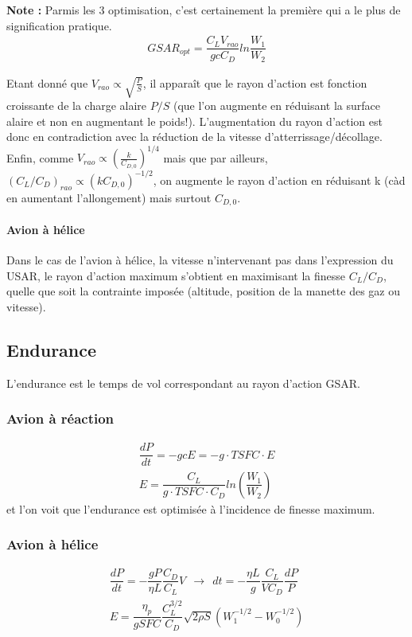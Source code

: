 \documentclass{report}
\begin{document}
\textbf{Note :} Parmis les 3 optimisation, c'est certainement la première qui a le plus de signification pratique.\\
\begin{eqnarray}
GSAR_{opt} = \dfrac{C_L V_{rao}}{gcC_D}ln\dfrac{W_1}{W_2}
\end{eqnarray}

Etant donné que $V_{rao}\propto\sqrt{\frac{P}{S}}$, il apparaît que le rayon d'action est fonction croissante de la charge alaire $P/S$ (que l'on augmente en réduisant la surface alaire et non en augmentant le poids!). L'augmentation du rayon d'action est donc en contradiction avec la réduction de la vitesse d'atterrissage/décollage. Enfin, comme $V_{rao}\propto(\frac{k}{C_{D,0}})^{1/4}$ mais que par ailleurs, $(C_L/C_D)_{rao}\propto (kC_{D,0})^{-1/2}$, on augmente le rayon d'action en réduisant k (càd en aumentant l'allongement) mais surtout $C_{D,0}$.

\paragraph{Avion à hélice} Dans le cas de l’avion à hélice, la vitesse n’intervenant pas dans l’expression du USAR, le rayon d’action maximum s’obtient en maximisant la finesse $C_L/C_D$, quelle que soit la contrainte imposée (altitude, position de la manette des gaz ou vitesse).

\subsection{Endurance}


L’endurance est le temps de vol correspondant au rayon d’action GSAR. 

\subsubsection{Avion à réaction}
\begin{eqnarray}
\dfrac{dP}{dt}=-gcE=-g\cdot TSFC\cdot E\\
E=\dfrac{C_L}{g\cdot TSFC\cdot C_D}ln(\dfrac{W_1}{W_2})
\end{eqnarray}
et l’on voit que l’endurance est optimisée à l’incidence de finesse maximum.

\subsubsection{Avion à hélice}

\begin{eqnarray}
\dfrac{dP}{dt}=-\dfrac{gP}{\eta L}\dfrac{C_D}{C_L}V~~\rightarrow~~dt=-\dfrac{\eta L}{g}\dfrac{C_L}{VC_D}\dfrac{dP}{P}\\
E=\dfrac{\eta_p}{gSFC}\dfrac{C_L^{3/2}}{C_D}\sqrt{2\rho S}(W_1^{-1/2}-W_0^{-1/2})
\end{eqnarray}
\end{document}
